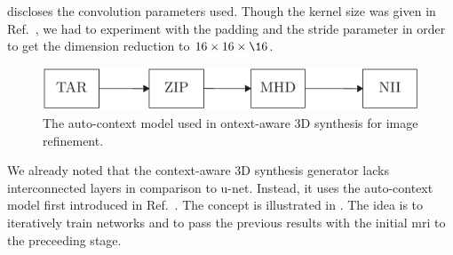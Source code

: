  discloses the convolution parameters used. Though
the kernel size was given in Ref.~\cite{Nie16}, we had to experiment with
the padding and the stride parameter in order to get the dimension reduction
to $16\times16\times\16$.
\begin{figure}[h]
  \centering
  \includegraphics[page=7,width=.8\linewidth]{figure/diagrams.pdf}
  \caption{The auto-context model used in ontext-aware 3D synthesis for
    image refinement.
	}\label{fig:synthesis:refine}
\end{figure}
We already noted that the context-aware 3D synthesis generator lacks
interconnected layers in comparison to u-net. Instead, it uses the
auto-context model first introduced in Ref.~\cite{Tu2010}. The concept is
illustrated in . The idea is to iteratively train
networks and to pass the previous results with the initial \gls{mri} to the
preceeding stage.
